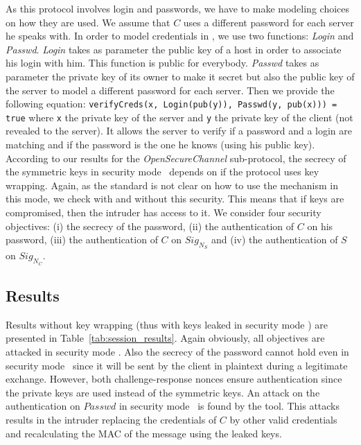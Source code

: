 As this protocol involves login and passwords, we have to make
modeling choices on how they are used.   We assume that $C$ uses a
different password for each server he speaks with.  In order to model
credentials in \proverif, we use two functions: {\em Login} and {\em
  Passwd}.  {\em Login} takes as parameter the public key of a host in
order to associate his login with him. This function is public for
everybody.  {\em Passwd} takes as parameter the private key of its
owner to make it secret but also the public key of the server to model
a different password for each server.  Then we provide the following
equation: \texttt{verifyCreds(x, Login(pub(y)), Passwd(y, pub(x))) =
  true} where \texttt{x} the private key of the server and \texttt{y}
the private key of the client (not revealed to the server).  It allows
the server to verify if a password and a login are matching and if the
password is the one he knows (using his public key).
According to our results for the {\em OpenSecureChannel} sub-protocol, the
secrecy of the symmetric keys in security mode \sms~depends on if the protocol
uses key wrapping.
Again, as the \opcua{} standard is not clear on how to use the mechanism in
this mode, we check with and without this security.
This means that if keys are compromised, then the intruder has access to it.
We consider four security objectives: (i) the secrecy of the
password, (ii) the authentication of $C$ on his password, (iii) the
authentication of $C$ on $Sig_{N_{S}}$ and (iv) the authentication of $S$ on
$Sig_{N_{C}}$.

\subsection{Results}

Results without key wrapping (thus with keys leaked in security mode \sms) are
presented in Table~\ref{tab:session_results}.
Again obviously, all objectives are attacked in security mode \smn.
Also the secrecy of the password cannot hold even in security mode \sms~since
it will be sent by the client in plaintext during a legitimate exchange.
However, both challenge-response nonces ensure authentication since the private
keys are used instead of the symmetric keys.
An attack on the authentication on $Passwd$ in security mode \sms~is found by
the tool.
This attacks results in the intruder replacing the credentials of $C$ by other
valid credentials and recalculating the MAC of the message using the leaked keys.

